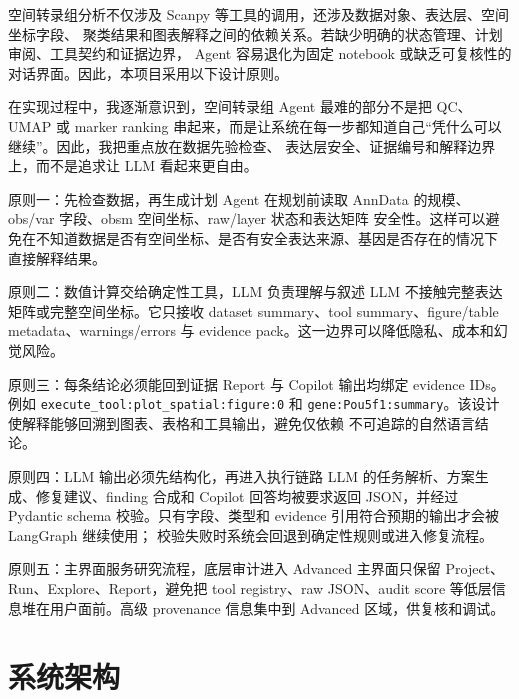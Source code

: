 \documentclass[11pt,a4paper]{article}
\newcommand{\breakcode}[1]{\begingroup\ttfamily\small\nolinkurl{#1}\endgroup}
\begin{document}
空间转录组分析不仅涉及 Scanpy 等工具的调用，还涉及数据对象、表达层、空间坐标字段、
聚类结果和图表解释之间的依赖关系。若缺少明确的状态管理、计划审阅、工具契约和证据边界，
Agent 容易退化为固定 notebook 或缺乏可复核性的对话界面。因此，本项目采用以下设计原则。

在实现过程中，我逐渐意识到，空间转录组 Agent 最难的部分不是把 QC、UMAP 或 marker ranking
串起来，而是让系统在每一步都知道自己“凭什么可以继续”。因此，我把重点放在数据先验检查、
表达层安全、证据编号和解释边界上，而不是追求让 LLM 看起来更自由。

\begin{decisionbox}{原则一：先检查数据，再生成计划}
  Agent 在规划前读取 AnnData 的规模、obs/var 字段、obsm 空间坐标、raw/layer 状态和表达矩阵
  安全性。这样可以避免在不知道数据是否有空间坐标、是否有安全表达来源、基因是否存在的情况下
  直接解释结果。
\end{decisionbox}

\begin{decisionbox}{原则二：数值计算交给确定性工具，LLM 负责理解与叙述}
  LLM 不接触完整表达矩阵或完整空间坐标。它只接收 dataset summary、tool summary、figure/table
  metadata、warnings/errors 与 evidence pack。这一边界可以降低隐私、成本和幻觉风险。
\end{decisionbox}

\begin{decisionbox}{原则三：每条结论必须能回到证据}
  Report 与 Copilot 输出均绑定 evidence IDs。例如 \breakcode{execute_tool:plot_spatial:figure:0}
  和 \breakcode{gene:Pou5f1:summary}。该设计使解释能够回溯到图表、表格和工具输出，避免仅依赖
  不可追踪的自然语言结论。
\end{decisionbox}

\begin{decisionbox}{原则四：LLM 输出必须先结构化，再进入执行链路}
  LLM 的任务解析、方案生成、修复建议、finding 合成和 Copilot 回答均被要求返回 JSON，并经过
  Pydantic schema 校验。只有字段、类型和 evidence 引用符合预期的输出才会被 LangGraph 继续使用；
  校验失败时系统会回退到确定性规则或进入修复流程。
\end{decisionbox}

\begin{decisionbox}{原则五：主界面服务研究流程，底层审计进入 Advanced}
  主界面只保留 Project、Run、Explore、Report，避免把 tool registry、raw JSON、audit score
  等低层信息堆在用户面前。高级 provenance 信息集中到 Advanced 区域，供复核和调试。
\end{decisionbox}

\section{系统架构}
\end{document}
